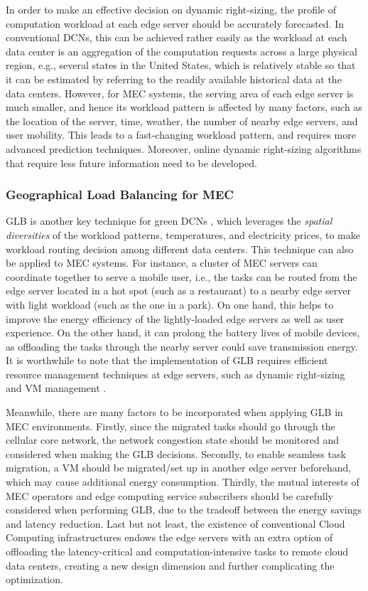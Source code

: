 \documentclass[journal]{IEEEtran}
\begin{document}
{In order to make an effective decision on dynamic right-sizing, the profile of computation workload at each edge server should be accurately forecasted. In conventional DCNs, this can be achieved rather easily as the workload at each data center is an aggregation of the computation requests across a large physical region, e.g., several states in the United States, which is relatively stable so that it can be estimated by referring to the readily available historical data at the data centers. However, for MEC systems, the serving area of each edge server is much smaller, and hence its workload pattern is affected by many factors, such as the location of the server, time, weather, the number of nearby edge servers, and user mobility. This leads to a fast-changing workload pattern, and requires more advanced prediction techniques. Moreover, online dynamic right-sizing algorithms that require less future information need to be developed.

\subsubsection{\textbf{Geographical Load Balancing for MEC}}

GLB is another key technique for green DCNs \cite{MLin1206,HXu1506TPDS}, which leverages the \emph{spatial diversities} of the workload patterns, temperatures, and electricity prices, to make workload routing decision among different data centers. This technique can also be applied to MEC systems. For instance, a cluster of MEC servers can coordinate together to serve a mobile user, i.e., the tasks can be routed from the edge server located in a hot spot (such as a restaurant) to a nearby edge server with light workload (such as the one in a park). On one hand, this helps to improve the energy efficiency of the lightly-loaded edge servers as well as user experience. On the other hand, it can prolong the battery lives of mobile devices, as offloading the tasks through the nearby server could save transmission energy. It is worthwhile to note that the implementation of GLB requires efficient resource management techniques at edge servers, such as dynamic right-sizing and VM management \cite{BeloglazovCCGrid1005,XLiINFOCOM1404,LChenINFOCOM1404,ZHanINFOCOM1604}.

Meanwhile, there are many factors to be incorporated when applying GLB in MEC environments. Firstly, since the migrated tasks should go through the cellular core network, the network congestion state should be monitored and considered when making the GLB decisions. Secondly, to enable seamless task migration, a VM should be migrated/set up in another edge server beforehand, which may cause additional energy consumption. Thirdly, the mutual interests of MEC operators and edge computing service subscribers should be carefully considered when performing GLB, due to the tradeoff between the energy savings and latency reduction. Last but not least, the existence of conventional Cloud Computing infrastructures endows the edge servers with an extra option of offloading the latency-critical and computation-intensive tasks to remote cloud data centers, creating a new design dimension and further complicating the optimization.

}
\end{document}
